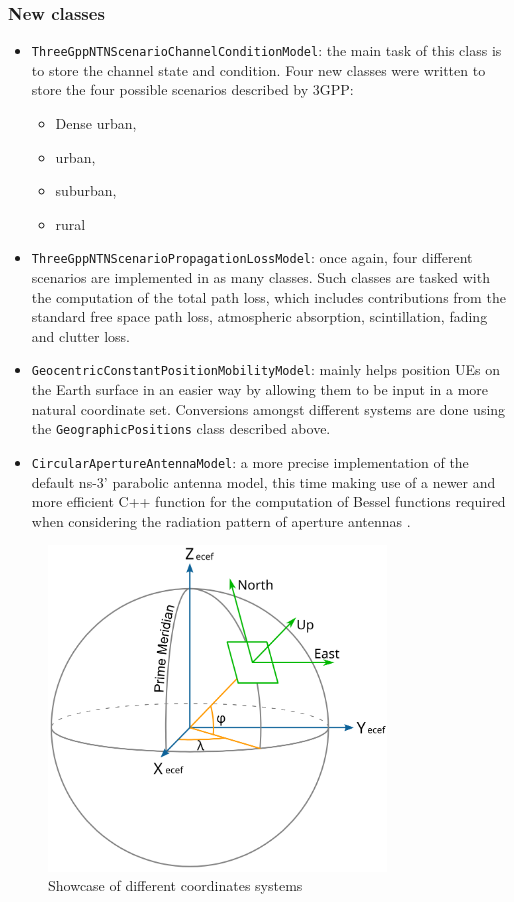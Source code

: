 \subsubsection{New classes}
\begin{itemize}
    \item \texttt{ThreeGppNTNScenarioChannelConditionModel}: the main task of this class is to store the channel state and condition. Four new classes were written to store the four possible scenarios described by \ac{3GPP}:
    \begin{itemize}
        \item Dense urban,
        \item urban,
        \item suburban,
        \item rural
    \end{itemize}
    \item \texttt{ThreeGppNTNScenarioPropagationLossModel}: once again, four different scenarios are implemented in as many classes. Such classes are tasked with the computation of the total path loss, which includes contributions from the standard free space path loss, atmospheric absorption, scintillation, fading and clutter loss.
    \item \texttt{GeocentricConstantPositionMobilityModel}: mainly helps position \ac{UE}s on the Earth surface in an easier way by allowing them to be input in a more natural coordinate set. Conversions amongst different systems are done using the \texttt{GeographicPositions} class described above.
    \item \texttt{CircularApertureAntennaModel}: a more precise implementation of the default ns-3' parabolic antenna model, this time making use of a newer and more efficient C++ function for the computation of Bessel functions required when considering the radiation pattern of aperture antennas \cite{rad-patterns}.
\end{itemize}




\begin{figure}[ht]
    \centering
    \includegraphics[width=0.8\textwidth]{res/coord_systems.png}
    \caption{Showcase of different coordinates systems \cite{wiki_coords}}
    \label{fig:coord-syst}
\end{figure}

